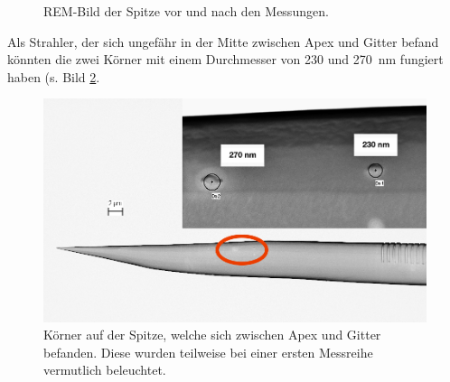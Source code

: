 \documentclass[bachelor,       %
               twoside,        %
               BCOR10mm,       %
               english,ngerman, %
               final,          %
               ]{GAUBM}
\begin{document}
\begin{figure}[h!]
  \centering
  \hfill
  \hfill
  \caption{REM-Bild der Spitze vor und nach den Messungen.}
  \label{fig:rem}
\end{figure}

Als Strahler, der sich ungefähr in der Mitte zwischen Apex und Gitter befand könnten die zwei Körner mit einem Durchmesser von 230 und \SI{270}{\nm} fungiert haben (s. Bild \ref{fig:hotspots}.

\begin{figure}[h]
	\centering
	\includegraphics[width=0.8\linewidth]{Hotspots}
	\caption{Körner auf der Spitze, welche sich zwischen Apex und Gitter befanden. Diese wurden teilweise bei einer ersten Messreihe vermutlich beleuchtet.}
	\label{fig:hotspots}
\end{figure}
\end{document}
